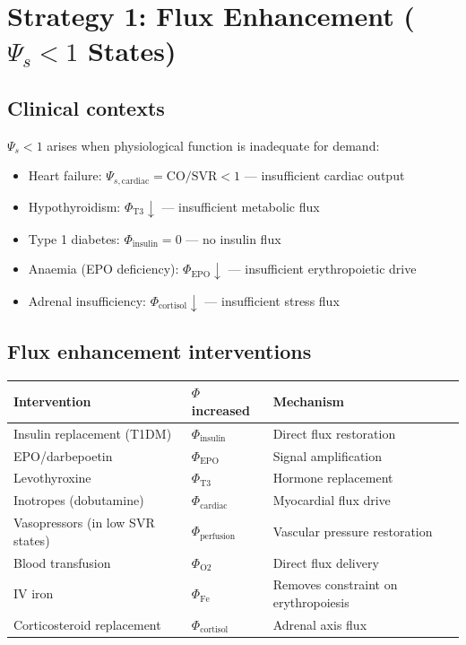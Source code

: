 \documentclass[12pt,a4paper]{article}
\begin{document}
\section{Strategy 1: Flux Enhancement ($\Psi_s < 1$ States)}

\subsection{Clinical contexts}

$\Psi_s < 1$ arises when physiological function is inadequate for demand:
\begin{itemize}
    \item Heart failure: $\Psi_{s,\mathrm{cardiac}} = \mathrm{CO}/\mathrm{SVR} < 1$ --- insufficient cardiac output
    \item Hypothyroidism: $\Phi_{\mathrm{T3}} \downarrow$ --- insufficient metabolic flux
    \item Type 1 diabetes: $\Phi_{\mathrm{insulin}} = 0$ --- no insulin flux
    \item Anaemia (EPO deficiency): $\Phi_{\mathrm{EPO}} \downarrow$ --- insufficient erythropoietic drive
    \item Adrenal insufficiency: $\Phi_{\mathrm{cortisol}} \downarrow$ --- insufficient stress flux
\end{itemize}

\subsection{Flux enhancement interventions}

\begin{center}
\begin{tabular}{lll}
\toprule
Intervention & $\Phi$ increased & Mechanism \\
\midrule
Insulin replacement (T1DM) & $\Phi_{\mathrm{insulin}}$ & Direct flux restoration \\
EPO/darbepoetin & $\Phi_{\mathrm{EPO}}$ & Signal amplification \\
Levothyroxine & $\Phi_{\mathrm{T3}}$ & Hormone replacement \\
Inotropes (dobutamine) & $\Phi_{\mathrm{cardiac}}$ & Myocardial flux drive \\
Vasopressors (in low SVR states) & $\Phi_{\mathrm{perfusion}}$ & Vascular pressure restoration \\
Blood transfusion & $\Phi_{\mathrm{O2}}$ & Direct flux delivery \\
IV iron & $\Phi_{\mathrm{Fe}}$ & Removes constraint on erythropoiesis \\
Corticosteroid replacement & $\Phi_{\mathrm{cortisol}}$ & Adrenal axis flux \\
\bottomrule
\end{tabular}
\end{center}
\end{document}
